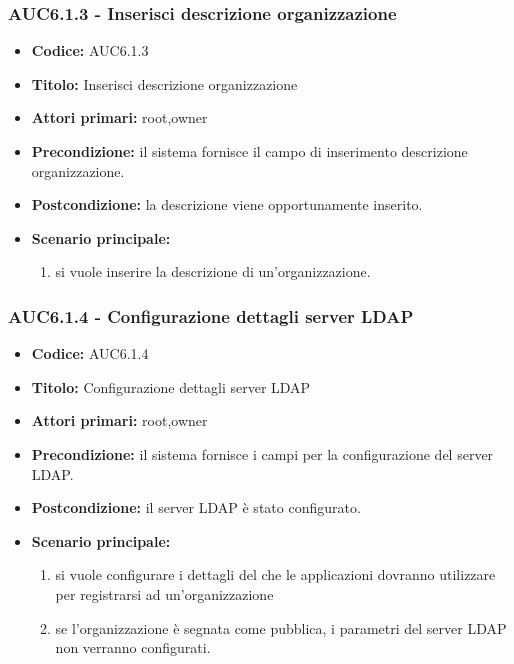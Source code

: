 \documentclass[casi-duso]{subfiles}
\begin{document}
  \subsubsection{AUC6.1.3 - Inserisci descrizione organizzazione}%
  \label{subsub:AUC6.1.3}
  \begin{itemize}
    \item \textbf{Codice:} AUC6.1.3
    \item \textbf{Titolo:} Inserisci descrizione organizzazione
    \item \textbf{Attori primari:} root,owner
    \item \textbf{Precondizione:} il sistema fornisce il campo di inserimento descrizione organizzazione.
    \item \textbf{Postcondizione:} la descrizione viene opportunamente inserito.
    \item \textbf{Scenario principale:}
    \begin{enumerate}
      \item si vuole inserire la descrizione di un'organizzazione.
    \end{enumerate}
  \end{itemize}

  \subsubsection{AUC6.1.4 - Configurazione dettagli server LDAP}%
  \label{subsub:AUC6.1.4}
  \begin{itemize}
    \item \textbf{Codice:} AUC6.1.4
    \item \textbf{Titolo:} Configurazione dettagli server LDAP
    \item \textbf{Attori primari:} root,owner
    \item \textbf{Precondizione:} il sistema fornisce i campi per la configurazione del server LDAP.
    \item \textbf{Postcondizione:} il server LDAP è stato configurato.
    \item \textbf{Scenario principale:}
    \begin{enumerate}
      \item si vuole configurare i dettagli del  che le applicazioni dovranno utilizzare per registrarsi ad un'organizzazione
      \item se l'organizzazione è segnata come pubblica, i parametri del server LDAP non verranno configurati. 
    \end{enumerate}
  \end{itemize}
\end{document}
